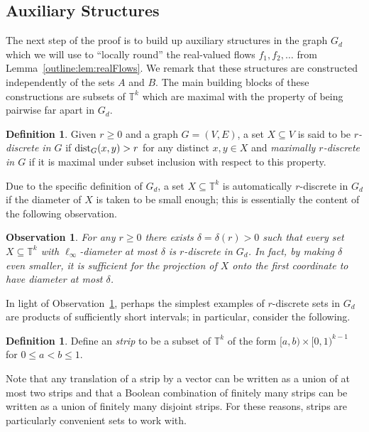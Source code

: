 \documentclass[12pt,a4paper]{amsart}
\numberwithin{equation}{section}
\newtheorem{obs}[equation]{Observation}
\theoremstyle{definition}
\newtheorem{defn}[equation]{Definition}
\begin{document}
\subsection{Auxiliary Structures}

The next step of the proof is to build up auxiliary structures in the graph $G_d$ which we will use to ``locally round'' the real-valued flows $f_1,f_2,\dots$ from Lemma~\ref{outline:lem:realFlows}. We remark that these structures are constructed independently of the sets $A$ and $B$. The main building blocks of these constructions are subsets of $\mathbb{T}^k$ which are maximal with the property of being pairwise far apart in $G_d$. 

\begin{defn}
\label{def:discrete}
Given $r\geq0$ and a graph $G=(V,E)$, a set $X\subseteq V$ is said to be \emph{$r$-discrete in $G$} if $\operatorname{dist}_G(x,y) > r$ for any distinct $x,y\in X$ and \emph{maximally $r$-discrete in $G$} if it is maximal under subset inclusion with respect to this property. 
\end{defn}

Due to the specific definition of $G_d$, a set $X\subseteq \mathbb{T}^k$ is automatically $r$-discrete in $G_d$ if the diameter of $X$ is taken to be small enough; this is essentially the content of the following observation.

\begin{obs}
\label{outline:obs:diamDiscrete}
For any $r\geq0$ there exists $\delta=\delta(r)>0$ such that every set $X\subseteq \mathbb{T}^k$ with $\ell_\infty$-diameter at most $\delta$ is $r$-discrete in $G_d$. In fact, by making $\delta$ even smaller, it is sufficient for the projection of $X$ onto the first coordinate to have diameter at most $\delta$. 
\end{obs}

In light of Observation~\ref{outline:obs:diamDiscrete}, perhaps the simplest examples of $r$-discrete sets in $G_d$ are products of sufficiently short intervals; in particular, consider the following. 

\begin{defn}
\label{def:strip}
Define an \emph{strip} to be a subset of $\mathbb{T}^k$ of the form $[a,b)\times [0,1)^{k-1}$ for $0\leq a<b\leq 1$.
\end{defn}

Note that any translation of a strip by a vector can be written as a union of at most two strips and that a Boolean combination of finitely many strips can be written as a union of finitely many disjoint strips. For these reasons, strips are particularly convenient sets to work with.
\end{document}
